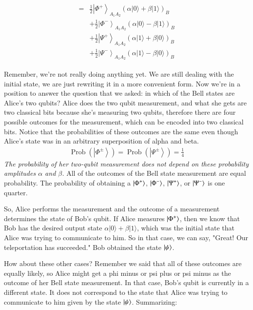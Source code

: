 \begin{align}
    \begin{aligned}
=&\frac{1}{2}\left|\Phi^{+}\right\rangle_{A_{1} A_{2}}(\alpha|0\rangle+\beta|1\rangle)_{B} \\
&+\frac{1}{2}\left|\Phi^{-}\right\rangle_{A_{1} A_{2}}(\alpha|0\rangle-\beta|1\rangle)_{B} \\
&+\frac{1}{2}\left|\Psi^{+}\right\rangle_{A_{1} A_{2}}(\alpha|1\rangle+\beta|0\rangle)_{B} \\
&+\frac{1}{2}\left|\Psi^{-}\right\rangle_{A_{1} A_{2}}(\alpha|1\rangle-\beta|0\rangle)_{B}
\end{aligned}
\label{eq:teleport-alice-basis}
\end{align}

Remember, we're not really doing anything yet.  We are still dealing with the initial state, we are just rewriting it in a more convenient form. Now we're in a position to answer the question that we asked: in which of the Bell states are Alice's two qubits? Alice does the two qubit measurement, and what she gets are two classical bits because she's measuring two qubits, therefore there are four possible outcomes for the measurement, which can be encoded into two classical bits. Notice that the probabilities of these outcomes are the same even though Alice's state was in an arbitrary superposition of alpha and beta.
\begin{align}
\operatorname{Prob}\left(\left|\Phi^{\pm}\right\rangle\right)=\operatorname{Prob}\left(\left|\Psi^{\pm}\right\rangle\right)=\frac{1}{4}
\end{align}
\emph{The probability of her two-qubit measurement does not depend on these probability amplitudes $\alpha$ and $\beta$.} All of the outcomes of the Bell state measurement are equal probability. The probability of obtaining a $\left| \Phi^+ \right\rangle$, $\left| \Phi^- \right\rangle$, $\left| \Psi^+ \right\rangle$, or $\left| \Psi^- \right\rangle$ is one quarter.

So, Alice performs the measurement and the outcome of a measurement determines the state of Bob's qubit. If Alice measures $\left| \Phi^+ \right\rangle$, then we know that Bob has the desired output state $\alpha|0\rangle+\beta|1\rangle$, which was the initial state that Alice was trying to communicate to him. So in that case, we can say, "Great! Our teleportation has succeeded." Bob obtained the state $\left| \psi \right\rangle$.

How about these other cases? Remember we said that all of these outcomes are equally likely, so Alice might get a phi minus or psi plus or psi minus as the outcome of her Bell state measurement. In that case, Bob's qubit is currently in a different state. It does not correspond to the state that Alice was trying to communicate to him given by the state $\left| \psi \right\rangle$.  Summarizing:

